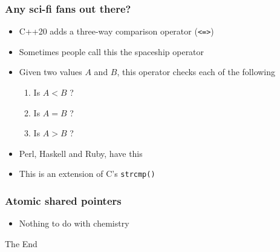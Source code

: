 \documentclass{beamer}
\begin{document}
\begin{frame}
\frametitle{Any sci-fi fans out there?}
\begin{itemize}
\setlength\itemsep{2em}
\item C++20 adds a three-way comparison operator (\texttt{<=>})
\item Sometimes people call this the spaceship operator
\item Given two values $A$ and $B$, this operator checks each of the following
\begin{enumerate}
\item Is $A < B$ ?
\item Is $A = B$ ?
\item Is $A > B$ ?
\end{enumerate}

\item Perl, Haskell and Ruby, have this

\item This is an extension of C's \texttt{strcmp()}
\end{itemize}
\end{frame}

\begin{frame}
\frametitle{Atomic shared pointers}

\begin{itemize}
\item Nothing to do with chemistry

\end{itemize}

\end{frame}

\begin{frame}
\Huge{\centerline{The End}}
\end{frame}
\end{document}
